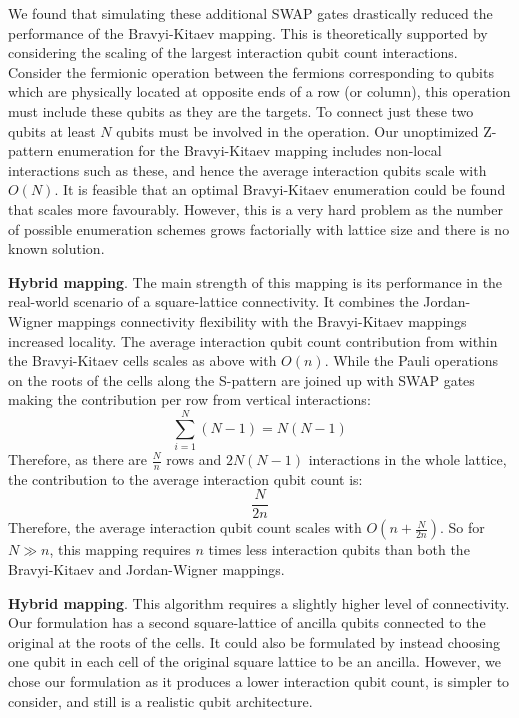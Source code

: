 \documentclass[pdftex,pra,aps,twocolumn,twoside]{revtex4-2}
\theoremstyle{plain}
\theoremstyle{note}
\newcommand\+{{\footnotesize \raisebox{0.3ex}{+}}}
\begin{document}
We found that simulating these additional SWAP gates drastically reduced the performance of the Bravyi-Kitaev mapping. This is theoretically supported by considering the scaling of the largest interaction qubit count interactions. Consider the fermionic operation between the fermions corresponding to qubits which are physically located at opposite ends of a row (or column), this operation must include these qubits as they are the targets. To connect just these two qubits at least $N$ qubits must be involved in the operation. Our unoptimized Z-pattern enumeration for the Bravyi-Kitaev mapping includes non-local interactions such as these, and hence the average interaction qubits scale with $O(N)$. It is feasible that an optimal Bravyi-Kitaev enumeration could be found that scales more favourably. However, this is a very hard problem as the number of possible enumeration schemes grows factorially with lattice size and there is no known solution.

\textbf {Hybrid mapping}.
The main strength of this mapping is its performance in the real-world scenario of a square-lattice connectivity. It combines the Jordan-Wigner mappings connectivity flexibility with the Bravyi-Kitaev mappings increased locality. The average interaction qubit count contribution from within the Bravyi-Kitaev cells scales as above with $O(n)$. While the Pauli operations on the roots of the cells along the S-pattern are joined up with SWAP gates making the contribution per row from vertical interactions:
\begin{equation}
        \sum_{i=1}^{N} (N-1) = N(N-1)
\end{equation}
Therefore, as there are $\frac{N}{n}$ rows and $2N(N-1)$ interactions in the whole lattice, the contribution to the average interaction qubit count is:
\begin{equation}
     \frac{N}{2n}
\end{equation}
Therefore, the average interaction qubit count scales with $O(n + \frac{N}{2n})$. So for $N \gg n$, this mapping requires $n$ times less interaction qubits than both the Bravyi-Kitaev and Jordan-Wigner mappings.

\textbf {Hybrid\+ mapping}.
This algorithm requires a slightly higher level of connectivity. Our formulation has a second square-lattice of ancilla qubits connected to the original at the roots of the cells. It could also be formulated by instead choosing one qubit in each cell of the original square lattice to be an ancilla. However, we chose our formulation as it produces a lower interaction qubit count, is simpler to consider, and still is a realistic qubit architecture.
\end{document}

